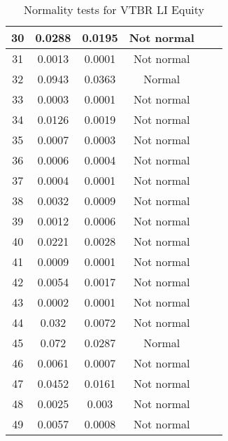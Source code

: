 \begin{table}[h]
\begin{tabular}{|c|c|c|c|c|c|}
		30 & 0.0288 & 0.0195 & Not normal\\\hline
		31 & 0.0013 & 0.0001 & Not normal\\\hline
		32 & 0.0943 & 0.0363 & Normal\\\hline
		33 & 0.0003 & 0.0001 & Not normal\\\hline
		34 & 0.0126 & 0.0019 & Not normal\\\hline
		35 & 0.0007 & 0.0003 & Not normal\\\hline
		36 & 0.0006 & 0.0004 & Not normal\\\hline
		37 & 0.0004 & 0.0001 & Not normal\\\hline
		38 & 0.0032 & 0.0009 & Not normal\\\hline
		39 & 0.0012 & 0.0006 & Not normal\\\hline
		40 & 0.0221 & 0.0028 & Not normal\\\hline
		41 & 0.0009 & 0.0001 & Not normal\\\hline
		42 & 0.0054 & 0.0017 & Not normal\\\hline
		43 & 0.0002 & 0.0001 & Not normal\\\hline
		44 & 0.032 & 0.0072 & Not normal\\\hline
		45 & 0.072 & 0.0287 & Normal\\\hline
		46 & 0.0061 & 0.0007 & Not normal\\\hline
		47 & 0.0452 & 0.0161 & Not normal\\\hline
		48 & 0.0025 & 0.003 & Not normal\\\hline
		49 & 0.0057 & 0.0008 & Not normal\\\hline
	\end{tabular}
	\caption{Normality tests for VTBR LI Equity}
	\label{tab:normality_tests_VTBR_}
\end{table}
